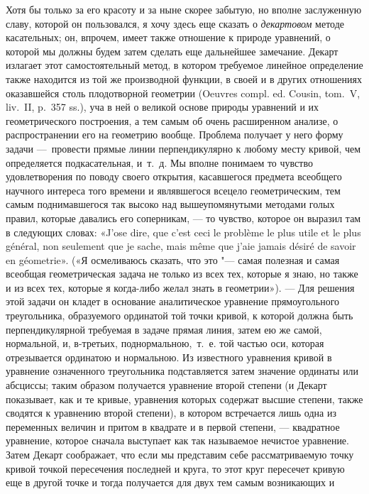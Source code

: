 Хотя бы только за его красоту и за ныне скорее забытую, но вполне
заслуженную славу, которой он пользовался, я хочу здесь еще сказать о
{\em декартовом} методе касательных; он, впрочем, имеет
также отношение к природе уравнений, о которой мы должны будем затем
сделать еще дальнейшее замечание. Декарт излагает этот самостоятельный
метод, в котором требуемое линейное определение также находится из той же
производной функции, в своей и в других отношениях оказавшейся столь
плодотворной геометрии (Oeuvres compl. ed. Cousin, tom.~V, liv.~II, p.~357
ss.), уча в ней о великой основе природы уравнений и их геометрического
построения, а тем самым об очень расширенном анализе, о распространении его
на геометрию вообще. Проблема получает у него форму задачи —~провести
прямые линии перпендикулярно к любому месту кривой, чем определяется
подкасательная, и~т.~д. Мы вполне понимаем то чувство удовлетворения по
поводу своего открытия, касавшегося предмета всеобщего научного интереса
того времени и являвшегося всецело геометрическим, тем самым поднимавшегося
так высоко над вышеупомянутыми методами голых правил, которые давались его
соперникам, — то чувство, которое он выразил там в следующих словах:
«J’ose dire, que c’est ceci le problème le plus utile et le plus général,
non seulement que je sache, mais même que j’aie jamais désiré de savoir
en géometrie».
(«Я осмеливаюсь сказать, что это "--- самая полезная и самая всеобщая
геометрическая задача не только из всех тех, которые я знаю, но также и из
всех тех, которые я когда-либо желал знать в геометрии»). — Для решения
этой задачи он кладет в основание аналитическое уравнение прямоугольного
треугольника, образуемого ординатой той точки кривой, к которой должна быть
перпендикулярной требуемая в задаче прямая линия, затем ею же самой,
нормальной, и, в-третьих, поднормальною,~т.~е. той частью оси, которая
отрезывается ординатою и нормальною. Из известного уравнения кривой в
уравнение означенного треугольника подставляется затем значение ординаты
или абсциссы; таким образом получается уравнение второй степени (и Декарт
показывает, как и те кривые, уравнения которых содержат высшие степени,
также сводятся к уравнению второй степени), в котором встречается лишь одна
из переменных величин и притом в квадрате и в первой степени, — квадратное
уравнение, которое сначала выступает как так называемое нечистое уравнение.
Затем Декарт соображает, что если мы представим себе рассматриваемую точку
кривой точкой пересечения последней и круга, то этот круг пересечет кривую
еще в другой точке и тогда получается для двух тем самым возникающих и
